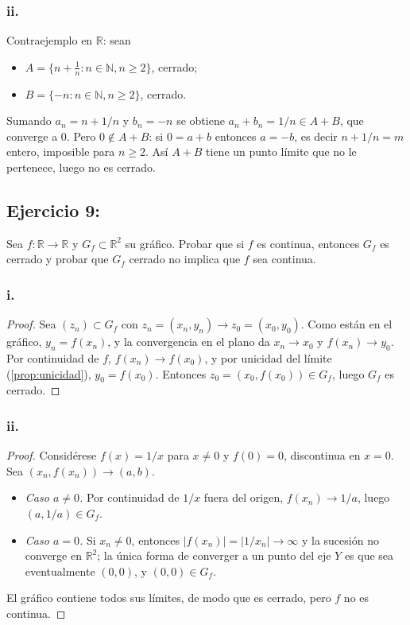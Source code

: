\documentclass[11pt, a4paper]{article}
\begin{document}
\subsubsection*{ii.}
Contraejemplo en $\mathbb{R}$: sean
\begin{itemize}
    \item $A = \{n + \frac{1}{n} : n \in \mathbb{N}, n \ge 2\}$, cerrado;
    \item $B = \{-n : n \in \mathbb{N}, n \ge 2\}$, cerrado.
\end{itemize}
Sumando $a_n = n + 1/n$ y $b_n = -n$ se obtiene $a_n + b_n = 1/n \in A+B$, que converge a $0$. Pero
$0 \notin A+B$: si $0 = a + b$ entonces $a = -b$, es decir $n + 1/n = m$ entero, imposible para
$n \ge 2$. Así $A+B$ tiene un punto límite que no le pertenece, luego no es cerrado.

\subsection*{Ejercicio 9:}

Sea $f: \mathbb{R} \to \mathbb{R}$ y $G_f \subset \mathbb{R}^2$ su gráfico.
Probar que si $f$ es continua, entonces $G_f$ es cerrado y probar que $G_f$ cerrado no implica que
$f$ sea continua.

\subsubsection*{i.}
\begin{proof}
Sea $(z_n) \subset G_f$ con $z_n = (x_n, y_n) \to z_0 = (x_0, y_0)$. Como están en el gráfico,
$y_n = f(x_n)$, y la convergencia en el plano da $x_n \to x_0$ y $f(x_n) \to y_0$. Por continuidad
de $f$, $f(x_n) \to f(x_0)$, y por unicidad del límite (\ref{prop:unicidad}), $y_0 = f(x_0)$. Entonces
$z_0 = (x_0, f(x_0)) \in G_f$, luego $G_f$ es cerrado.
\end{proof}

\subsubsection*{ii.}
\begin{proof}
Considérese $f(x) = 1/x$ para $x \neq 0$ y $f(0) = 0$, discontinua en $x = 0$. Sea
$(x_n, f(x_n)) \to (a, b)$.
\begin{itemize}
    \item \textit{Caso $a \neq 0$.} Por continuidad de $1/x$ fuera del origen, $f(x_n) \to 1/a$,
    luego $(a, 1/a) \in G_f$.
    \item \textit{Caso $a = 0$.} Si $x_n \neq 0$, entonces $|f(x_n)| = |1/x_n| \to \infty$ y la
    sucesión no converge en $\mathbb{R}^2$; la única forma de converger a un punto del eje $Y$ es que
    sea eventualmente $(0, 0)$, y $(0,0) \in G_f$.
\end{itemize}
El gráfico contiene todos sus límites, de modo que es cerrado, pero $f$ no es continua.
\end{proof}
\end{document}
